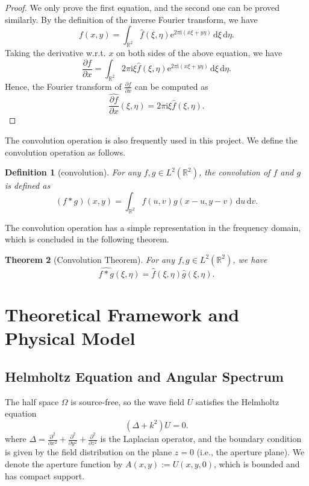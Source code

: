 \documentclass[12pt]{article}
\newtheorem{theorem}{Theorem}[section]
\newtheorem{definition}[theorem]{Definition}
\begin{document}
\begin{proof}
    We only prove the first equation, and the second one can be proved similarly. By the definition of the 
    inverse Fourier transform, we have
    \[
        f(x, y) = \int_{\mathbb{R}^2} \hat{f}(\xi, \eta) \mathrm{e}^{2\pi \mathrm{i} (x\xi + y\eta)}\,
        \mathrm{d}\xi \, \mathrm{d}\eta.
    \]
    Taking the derivative w.r.t. \( x \) on both sides of the above equation, we have
    \[
        \frac{\partial f}{\partial x} = \int_{\mathbb{R}^2} 2\pi \mathrm{i} \xi \hat{f}(\xi, \eta) 
        \mathrm{e}^{2\pi \mathrm{i} (x\xi + y\eta)}\, \mathrm{d}\xi \, \mathrm{d}\eta.
    \]
    Hence, the Fourier transform of \( \frac{\partial f}{\partial x} \) can be computed as
    \[
        \widehat{\frac{\partial f}{\partial x}}(\xi, \eta) = 2\pi \mathrm{i} \xi \hat{f}(\xi, \eta).
    \]
\end{proof}

The convolution operation is also frequently used in this project. We define the convolution operation as
follows.
\begin{definition}[convolution]
    For any \( f, g \in L^2(\mathbb{R}^2) \), the convolution of \( f \) and \( g \) is defined as
    \[
        (f * g)(x, y) = \int_{\mathbb{R}^2} f(u, v) g(x - u, y - v) \, \mathrm{d}u \, \mathrm{d}v.
    \]
\end{definition}

The convolution operation has a simple representation in the frequency domain, which is concluded in the
following theorem.

\begin{theorem}[Convolution Theorem] \label{thm:conv}
    For any \( f, g \in L^2(\mathbb{R}^2) \), we have
    \[
        \widehat{f * g}(\xi, \eta) = \hat{f}(\xi, \eta) \hat{g}(\xi, \eta).
    \]
\end{theorem}

\section{Theoretical Framework and Physical Model}

\subsection{Helmholtz Equation and Angular Spectrum}

The half space \( \Omega \) is source-free, so the wave field \(U\) satisfies the Helmholtz equation
\begin{equation} \label{eq:Helmholtz}
    (\Delta + k^2) U = 0.
\end{equation}
where \( \Delta = \frac{\partial^2}{\partial x^2} + \frac{\partial^2}{\partial y^2} + 
\frac{\partial^2}{\partial z^2} \) is the Laplacian operator, and the boundary condition is given by the 
field distribution on the plane \(z = 0\) (i.e., the aperture plane). We denote the aperture function by
\( A(x, y) := U(x, y, 0) \), which is bounded and has compact support. 
\end{document}
